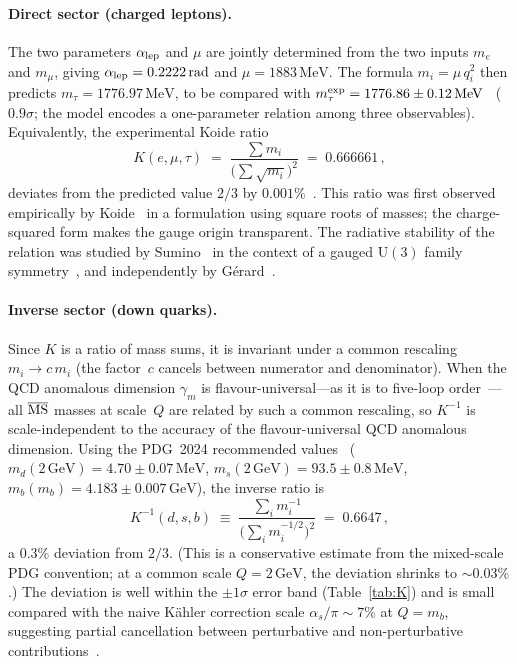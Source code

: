 \documentclass[preprint,12pt]{elsarticle}
\newcommand{\UU}{\mathrm{U}}
\newcommand{\MeV}{\,\mathrm{MeV}}
\newcommand{\GeV}{\,\mathrm{GeV}}
\begin{document}
\paragraph{Direct sector (charged leptons).}
The two parameters $\alpha_{\rm lep}$ and $\mu$
are jointly determined from the two inputs
$m_e$ and $m_\mu$, giving
$\alpha_{\rm lep} = 0.2222\,\mathrm{rad}$ and
$\mu = 1883\MeV$.
The formula $m_i = \mu\,q_i^2$ then predicts
$m_\tau = 1776.97\MeV$, to be compared with
$m_\tau^{\rm exp} = 1776.86 \pm 0.12\MeV$~\cite{PDG:2024}
($0.9\sigma$; the model encodes a one-parameter
relation among three observables).
Equivalently, the experimental Koide ratio
\begin{equation}
  K(e,\mu,\tau) \;=\;
  \frac{\sum m_i}{\bigl(\sum \sqrt{m_i}\bigr)^2}
  \;=\; 0.666661\,,
  \label{eq:K_lep}
\end{equation}
deviates from the predicted value $2/3$
by $0.001\%$~\cite{PDG:2024}.
This ratio was first observed empirically by
Koide~\cite{Koide:1983qe} in a formulation using
square roots of masses; the charge-squared form
makes the gauge origin transparent.
The radiative stability of the relation was
studied by Sumino~\cite{Sumino:2009}
in the context of a gauged $\UU(3)$ family
symmetry~\cite{Koide:2006},
and independently by
G\'erard~\cite{Gerard:2022}.

\paragraph{Inverse sector (down quarks).}
Since $K$ is a ratio of mass sums, it is invariant
under a common rescaling $m_i \to c\,m_i$
(the factor~$c$ cancels between numerator
and denominator).
When the QCD anomalous dimension $\gamma_m$ is
flavour-universal---as it is to five-loop
order~\cite{Martin:2019}---all $\overline{\rm MS}$
masses at scale~$Q$ are related by such a common
rescaling, so $K^{-1}$ is scale-independent
to the accuracy of the flavour-universal
QCD anomalous dimension.
Using the PDG~2024 recommended
values~\cite{PDG:2024}
($m_d(2\GeV) = 4.70 \pm 0.07\MeV$,
$m_s(2\GeV) = 93.5 \pm 0.8\MeV$,
$m_b(m_b) = 4.183 \pm 0.007\GeV$),
the inverse ratio is
\begin{equation}
  K^{-1}(d,s,b) \;\equiv\;
  \frac{\sum_i m_i^{-1}}
  {\bigl(\sum_i m_i^{-1/2}\bigr)^2}
  \;=\; 0.6647\,,
  \label{eq:Kinv}
\end{equation}
a $0.3\%$ deviation from $2/3$.
(This is a conservative estimate from the
mixed-scale PDG convention; at a common scale
$Q = 2\GeV$, the deviation shrinks to $\sim 0.03\%$.)
The deviation is well within the $\pm 1\sigma$ error band
(Table~\ref{tab:K}) and is small compared with the
naive K\"ahler correction scale
$\alpha_s/\pi \sim 7\%$ at $Q = m_b$,
suggesting partial cancellation between
perturbative and non-perturbative
contributions~\cite{Koide:2005,Zenczykowski:2012,RodejohannZhang:2011}.
\end{document}
